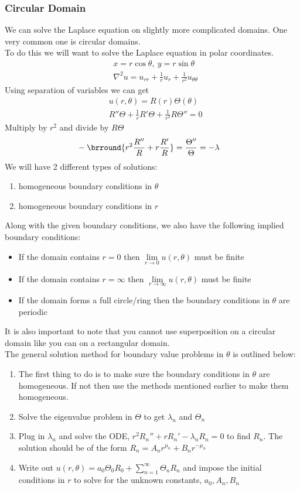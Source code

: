 \subsubsection{Circular Domain}
We can solve the Laplace equation on slightly more complicated domains. One very common one is circular domains.\\
To do this we will want to solve the Laplace equation in polar coordinates.
\begin{align*}
    &x=r\cos\theta,\ y=r\sin\theta\\
    &\nabla^2 u=u_{rr}+\frac{1}{r}u_r+\frac{1}{r^2}u_{\theta\theta}
\end{align*}
Using separation of variables we can get
\begin{align*}
    &u(r,\theta)=R(r)\Theta(\theta)\\
    &R''\Theta+\frac{1}{r}R'\Theta+\frac{1}{r^2}R\Theta''=0
\end{align*}
Multiply by $r^2$ and divide by $R\Theta$
\begin{align*}
    &-\brround{r^2\frac{R''}{R}+r\frac{R'}{R}}=\frac{\Theta''}{\Theta}=-\lambda
\end{align*}
We will have 2 different types of solutions:
\begin{enumerate}
    \item homogeneous boundary conditions in $\theta$
    \item homogeneous boundary conditions in $r$
\end{enumerate}
Along with the given boundary conditions, we also have the following implied boundary conditions:
\begin{itemize}
    \item If the domain contains $r=0$ then $\lim\limits_{r\to0}u(r,\theta)$ must be finite
    \item If the domain contains $r=\infty$ then $\lim\limits_{r\to\infty}u(r,\theta)$ must be finite
    \item If the domain forms a full circle/ring then the boundary conditions in $\theta$ are periodic
\end{itemize}
It is also important to note that you cannot use superposition on a circular domain like you can on a rectangular domain.\\
The general solution method for boundary value problems in $\theta$ is outlined below:
\begin{enumerate}
    \item The first thing to do is to make sure the boundary conditions in $\theta$ are homogeneous. If not then use the methods mentioned earlier to make them homogeneous.
    \item Solve the eigenvalue problem in $\Theta$ to get $\lambda_n$ and $\Theta_n$
    \item Plug in $\lambda_n$ and solve the ODE, $r^2R_n''+rR_n'-\lambda_n R_n=0$ to find $R_n$. The solution should be of the form ${R_n=A_nr^{\mu_n}+B_nr^{-\mu_n}}$
    \item Write out $u(r,\theta)=a_0\Theta_0R_0+\sum\limits_{n=1}^\infty\Theta_nR_n$ and impose the initial conditions in $r$ to solve for the unknown constants, $a_0,A_n,B_n$
\end{enumerate}
